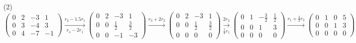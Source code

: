 \documentclass{article}
\begin{document}
\begin{itemize}
    \item[(2)]
        $
        \begin{pmatrix}
            0 & 2 & -3 & 1 \\
            0 & 3 & -4 & 3 \\
            0 & 4 & -7 & -1
        \end{pmatrix}
        \xrightarrow[r_4 - 2r_1]{r_2 - 1.5r_1}
        \begin{pmatrix}
            0 & 2 & -3 & 1 \\
            0 & 0& \frac{1}{2} & \frac{3}{2} \\
            0 & 0 & -1 & -3
        \end{pmatrix}
        \xrightarrow{r_3 + 2r_2}
        \begin{pmatrix}
            0 & 2 & -3 & 1 \\
            0 & 0& \frac{1}{2} & \frac{3}{2} \\
            0 & 0 & 0 & 0
        \end{pmatrix}
        \xrightarrow[\frac{1}{2}r_1]{2r_2}        
        \begin{pmatrix}
            0 & 1 & -\frac{3}{2} & \frac{1}{2} \\
            0 & 0 & 1 & 3 \\
            0 & 0 & 0 & 0
        \end{pmatrix}
        \xrightarrow{r_1 + \frac{3}{2}r_2}
        \begin{pmatrix}
            0 & 1 & 0 & 5 \\
            0 & 0 & 1 & 3 \\
            0 & 0 & 0 & 0
        \end{pmatrix}
        $


\end{itemize}
\end{document}
